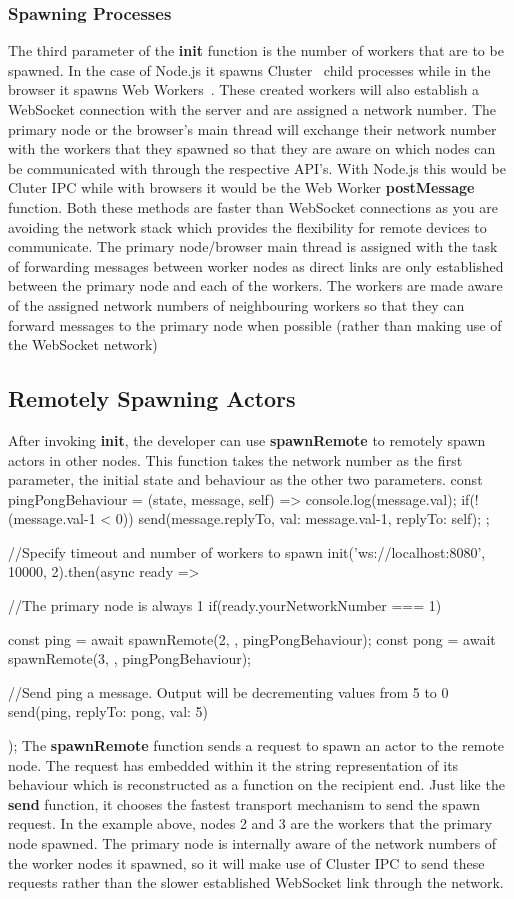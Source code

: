 \documentclass[12pt, a4paper]{report}
\newenvironment{code}
{\footnotesize\verbatim}{\endverbatim\normalfont}
\theoremstyle{definition}
\theoremstyle{definition}%
\theoremstyle{definition}%
\theoremstyle{definition}%
\theoremstyle{definition}%
\theoremstyle{definition}%
\begin{document}
\subsubsection{Spawning Processes}
The third parameter of the \textbf{init} function is the number of workers that are to be spawned. In the case of Node.js it spawns Cluster~\cite{cluster} child processes while in the browser it spawns Web Workers~\cite{webworkers}. These created workers will also establish a WebSocket connection with the server and are assigned a network number. The primary node or the browser's main thread will exchange their network number with the workers that they spawned so that they are aware on which nodes can be communicated with through the respective API's. With Node.js this would be Cluter IPC while with browsers it would be the Web Worker \textbf{postMessage} function. Both these methods are faster than WebSocket connections as you are avoiding the network stack which provides the flexibility for remote devices to communicate. The primary node/browser main thread is assigned with the task of forwarding messages between worker nodes as direct links are only established between the primary node and each of the workers. The workers are made aware of the assigned network numbers of neighbouring workers so that they can forward messages to the primary node when possible (rather than making use of the WebSocket network)

\subsection{Remotely Spawning Actors}
After invoking \textbf{init}, the developer can use \textbf{spawnRemote} to remotely spawn actors in other nodes. This function takes the network number as the first parameter, the initial state and behaviour as the other two parameters.
\begin{code}
const pingPongBehaviour = (state, message, self) => {
    console.log(message.val);
    if(!(message.val-1 < 0))
        send(message.replyTo, {val: message.val-1, replyTo: self});
};

//Specify timeout and number of workers to spawn
init('ws://localhost:8080', 10000, 2).then(async ready => {
    //The primary node is always 1
    if(ready.yourNetworkNumber === 1){
        const ping = await spawnRemote(2, {}, pingPongBehaviour);
        const pong = await spawnRemote(3, {}, pingPongBehaviour);

        //Send ping a message. Output will be decrementing values from 5 to 0
        send(ping, {replyTo: pong, val: 5})
    }
});
\end{code}
The \textbf{spawnRemote} function sends a request to spawn an actor to the remote node. The request has embedded within it the string representation of its behaviour which is reconstructed as a function on the recipient end. Just like the \textbf{send} function, it chooses the fastest transport mechanism to send the spawn request. In the example above, nodes 2 and 3 are the workers that the primary node spawned. The primary node is internally aware of the network numbers of the worker nodes it spawned, so it will make use of Cluster IPC to send these requests rather than the slower established WebSocket link through the network.
\end{document}

